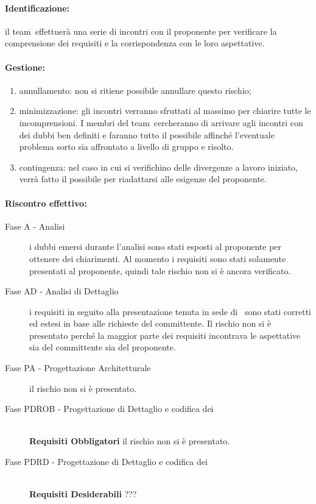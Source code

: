 \documentclass[../PianoProgetto.tex]{subfiles}
\begin{document}
	\paragraph*{Identificazione:} il team\g\ effettuerà una serie di incontri con il proponente per verificare la comprensione dei requisiti e la corrispondenza con le loro aspettative.
	
	\paragraph*{Gestione:}
	\begin{enumerate}
		\item annullamento: non si ritiene possibile annullare questo rischio;
		\item minimizzazione: gli incontri verranno sfruttati al massimo per chiarire tutte le incomprensioni. I membri del team\g\ cercheranno di arrivare agli incontri con dei dubbi ben definiti e faranno tutto il possibile affinché l'eventuale problema sorto sia affrontato a livello di gruppo e risolto.
		\item contingenza: nel caso in cui si verifichino delle divergenze a lavoro iniziato, verrà fatto il possibile per riadattarsi alle esigenze del proponente.
	\end{enumerate}	
	
	
	\paragraph*{Riscontro effettivo:}
		\begin{description}
			\item[Fase A - Analisi] i dubbi emersi durante l'analisi sono stati esposti al proponente per ottenere dei chiarimenti. Al momento i requisiti sono stati solamente presentati al proponente, quindi tale rischio non si è ancora verificato.
			\item[Fase AD - Analisi di Dettaglio]  i requisiti in seguito alla presentazione tenuta in sede di \revisionedeirequisiti\ sono stati corretti ed estesi in base alle richieste del committente. Il rischio non si è presentato perché la maggior parte dei requisiti incontrava le aspettative sia del committente sia del proponente. 
			\item[Fase PA - Progettazione Architetturale] il rischio non si è presentato.
			\item[Fase PDROB - Progettazione di Dettaglio e codifica dei]  \ \\
					\textbf{Requisiti Obbligatori} il rischio non si è presentato.
			\item[Fase PDRD - Progettazione di Dettaglio e codifica dei] \ \\
					\textbf{Requisiti Desiderabili} ???
		\end{description}

			
\end{document}
